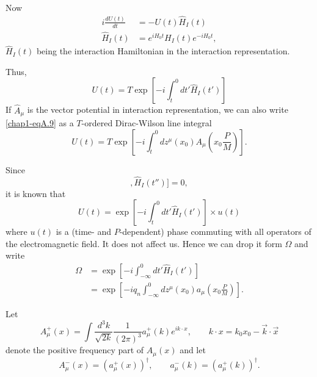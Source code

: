 Now
\begin{align*}
  i \frac{dU(t)}{dt} & = -U (t) \hat{H}_I(t)\\
  \hat{H}_I (t) & = e^{iH_0t} H_I (t) e^{-iH_0t}, \label{chap1-eqA.8}\tag{A.8}
\end{align*}
$\hat{H}_I(t)$ being the interaction Hamiltonian in the interaction representation.

Thus,
\begin{equation*}
U(t)= T\exp \left[-i \int^0_t dt' \hat{H}_I (t') \right]\label{chap1-eqA.9}\tag{A.9}
\end{equation*}
If $\hat{A}_\mu$ is the vector potential in interaction representation, we can also write \eqref{chap1-eqA.9} as a $T$-ordered Dirac-Wilson line integral
\begin{equation*}
U(t) = T \exp \left[-i \int^0_t dz^\mu (x_0) A_\mu  \left( x_0 \frac{P}{M}\right)\right]. \label{chap1-eqA.10}\tag{A.10}
\end{equation*}

Since
\begin{equation*}
  [[\hat{H}_I (t), \hat{H}_I(t')], \hat{H}_I (t'')]=0, \label{chap1-eqA.11}\tag{A.11}
\end{equation*}
it is known that \cite{key14}
\begin{equation*}
U(t) = \exp \left[ -i \int^0_t dt' \hat{H}_I (t')\right] \times u(t) \label{chap1-eqA.12}\tag{A.12}
\end{equation*}
where $u(t)$ is a (time- and $P$-dependent) phase commuting with all operators of the electromagnetic field. It does not affect us. Hence we can drop it form $\Omega$ and write
\begin{align*}
  \Omega & = \exp \left[-i \int^0_{-\infty} dt' \hat{H}_I (t') \right] \label{chap1-eqA.13}\tag{A.13}\\
  & = \exp \left[ -iq_n \int^0_{-\infty} dz^\mu (x_0) a_\mu \left( x_0 \frac{P}{M}\right)\right]. \label{chap1-eqA.14}\tag{A.14}
\end{align*}

Let
\begin{equation*}
  A_\mu^+ (x) = \int \frac{d^3k}{\sqrt{2k}} \frac{1}{(2\pi)^3}a_\mu^+ (k)e^{ik\cdot x}, \qquad k \cdot x = k_0 x_0- \vec{k} \cdot \vec{x} \label{chap1-eqA.15}\tag{A.15}
\end{equation*}
denote the positive frequency part of $A_\mu(x)$ and let
\begin{equation*}
A_\mu^- (x) = (a_\mu^+ (x))^\dagger, \qquad a_\mu^- (k) = (a_\mu^+ (k))^\dagger. \label{chap1-eqA.16}\tag{A.16}
\end{equation*}

